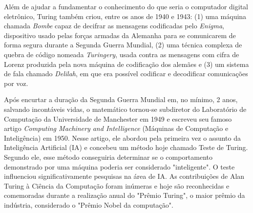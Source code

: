 \documentclass[
  12pt,     %
  openright,      %
  oneside,      %
  a4paper,      %
  english,      %
  brazil        %
  ]{abntex2}
\begin{document}
Além de ajudar a fundamentar o conhecimento do que seria o computador digital eletrônico, Turing também criou, entre os anos de 1940 e 1943: (1) uma máquina chamada \textit{Bombe} capaz de decifrar as mensagens codificadas pelo \textit{Enigma}, dispositivo usado pelas forças armadas da Alemanha para se comunicarem de forma segura durante a Segunda Guerra Mundial, (2) uma técnica complexa de quebra de código nomeada \textit{Turingery}, usada contra as mensagens com cifra de Lorenz produzida pela nova máquina de codificação dos alemães e (3) um sistema de fala chamado \textit{Delilah}, em que era possível codificar e decodificar comunicações por voz.

Após encurtar a duração da Segunda Guerra Mundial em, no mínimo, 2 anos, salvando incontáveis vidas, o matemático tornou-se subdiretor do Laboratório de Computação da Universidade de Manchester em 1949 e escreveu seu famoso artigo \textit{Computing Machinery and Intelligence} (Máquinas de Computação e Inteligência) em 1950. Nesse artigo, ele abordou pela primeira vez o assunto da Inteligência Artificial (IA) e concebeu um método hoje chamado Teste de Turing. Segundo ele, esse método conseguiria determinar se o comportamento demonstrado por uma máquina poderia ser considerado "inteligente".  O teste influenciou significativamente pesquisas na área de IA. As contribuições de Alan Turing à Ciência da Computação foram inúmeras e hoje são reconhecidas e comemoradas durante a realização anual do "Prêmio Turing", o maior prêmio da indústria, considerado o "Prêmio Nobel da computação".
\end{document}
